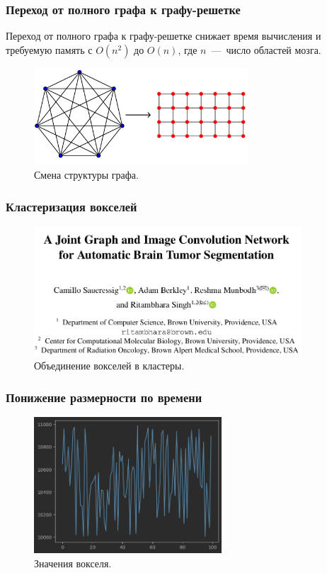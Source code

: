 \documentclass{beamer}
\begin{document}
	\begin{frame} 
		\frametitle{Переход от полного графа к графу-решетке}
		
		Переход от полного графа к графу-решетке снижает время вычисления и требуемую память с $O(n^2)$ до $O(n)$, где $n$~---~число областей мозга.
		
		\vspace{0.5cm}
						
		\begin{figure}
			\includegraphics[width=8cm]{../images/full_grid_graphs_1.pdf}
			\caption{Смена структуры графа.} 
			\label{fg:9}
		\end{figure}
			
	\end{frame}

	\begin{frame} 
		\frametitle{Кластеризация вокселей}				
				
		\begin{figure}
			\includegraphics[width=10cm]{../images/clusterization_1.png}
			\caption{Объединение вокселей в кластеры.} 
			\label{fg:10}
		\end{figure}	
	\end{frame}

	\begin{frame} 
		\frametitle{Понижение размерности по времени}				
		
		\begin{figure}
			\includegraphics[width=7cm]{../images/time_series.png}
			\caption{Значения вокселя.} 
			\label{fg:11}
		\end{figure}	
	\end{frame}	
\end{document}
